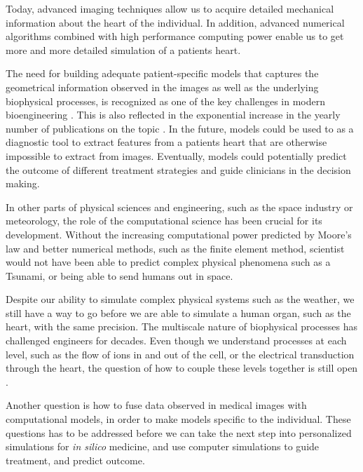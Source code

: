 

Today, advanced imaging techniques allow us to acquire detailed
mechanical information about the heart of the individual. In addition,
advanced numerical algorithms combined with high performance computing
power enable us to get more and more detailed simulation of a patients
heart. 



The need for building adequate patient-specific models that captures
the geometrical information observed in the images as well as the
underlying biophysical processes, is recognized as one of the key
challenges in modern bioengineering \cite{hunter2010vision}. This is
also reflected in the exponential increase in the yearly number of
publications on the topic \cite{sack2016personalised}.
In the future, models could be used to as a diagnostic tool to extract
features from a patients heart that are otherwise impossible to extract from
images. Eventually, models could potentially predict the outcome of
different treatment strategies and guide clinicians in the decision making.

In other parts of physical sciences and engineering, such as the
space industry or meteorology, the role of the computational
science has been crucial for its development. Without the increasing
computational power predicted by Moore's law
\cite{brock2006understanding} and better numerical methods, such as the
finite element method, scientist would not have been able to predict
complex physical phenomena such as a Tsunami, or being able to send
humans out in space. 

Despite our ability to simulate complex physical systems such as
the weather, we still have a way to go before we are able to
simulate a human organ, such as the heart, with the same precision. The
multiscale nature of biophysical processes has challenged engineers for decades.
Even though we understand processes at each level, such as the flow of
ions in and out of the cell, or the electrical transduction through the
heart, the question of how to couple these levels together is still open
\cite{noble2002modeling}.

Another question is how to fuse data observed in medical images with
computational models, in order to make models specific to the
individual. These questions has to be addressed before we can take the
next step into personalized simulations for \emph{in silico} medicine,
and use computer simulations to guide treatment, and predict outcome.


